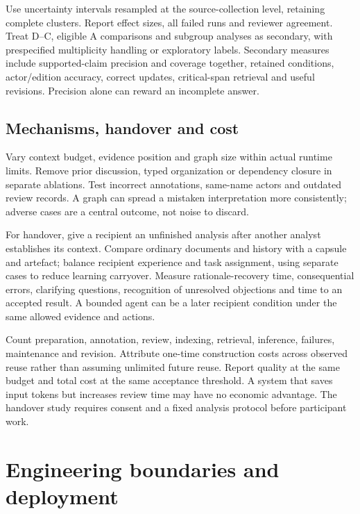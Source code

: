 \documentclass[
  11pt,
]{article}
\let\originalsection\section
\renewcommand{\section}{\Needspace{5\baselineskip}\originalsection}
\begin{document}
Use uncertainty intervals resampled at the source-collection level,
retaining complete clusters. Report effect sizes, all failed runs and
reviewer agreement. Treat D--C, eligible A comparisons and subgroup
analyses as secondary, with prespecified multiplicity handling or
exploratory labels. Secondary measures include supported-claim precision
and coverage together, retained conditions, actor/edition accuracy,
correct updates, critical-span retrieval and useful revisions. Precision
alone can reward an incomplete answer.

\subsection{Mechanisms, handover and
cost}\label{mechanisms-handover-and-cost}

Vary context budget, evidence position and graph size within actual
runtime limits. Remove prior discussion, typed organization or
dependency closure in separate ablations. Test incorrect annotations,
same-name actors and outdated review records. A graph can spread a
mistaken interpretation more consistently; adverse cases are a central
outcome, not noise to discard.

For handover, give a recipient an unfinished analysis after another
analyst establishes its context. Compare ordinary documents and history
with a capsule and artefact; balance recipient experience and task
assignment, using separate cases to reduce learning carryover. Measure
rationale-recovery time, consequential errors, clarifying questions,
recognition of unresolved objections and time to an accepted result. A
bounded agent can be a later recipient condition under the same allowed
evidence and actions.

Count preparation, annotation, review, indexing, retrieval, inference,
failures, maintenance and revision. Attribute one-time construction
costs across observed reuse rather than assuming unlimited future reuse.
Report quality at the same budget and total cost at the same acceptance
threshold. A system that saves input tokens but increases review time
may have no economic advantage. The handover study requires consent and
a fixed analysis protocol before participant work.

\section{Engineering boundaries and
deployment}\label{engineering-boundaries-and-deployment}
\end{document}

